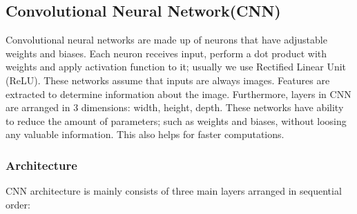 \documentclass[12pt, letterpaper]{article}
\begin{document}
\subsection{Convolutional Neural Network(CNN)}

Convolutional neural networks are made up of neurons that have adjustable weights and biases. Each neuron receives input, perform a dot product with weights and apply activation function to it; usually we use Rectified Linear Unit (ReLU). These networks assume that inputs are always images. Features are extracted to determine information about the image. Furthermore, layers in CNN are arranged in 3 dimensions: width, height, depth. These networks have ability to reduce the amount of parameters; such as weights and biases, without loosing any valuable information. This also helps for faster computations\cite{features_map}\cite{cnn_info}. 

\subsubsection{Architecture}

CNN architecture is mainly consists of three main layers arranged in sequential order:
\end{document}
